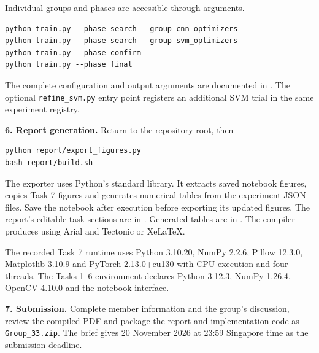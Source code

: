 Individual groups and phases are accessible through arguments.
\begin{verbatim}
python train.py --phase search --group cnn_optimizers
python train.py --phase search --group svm_optimizers
python train.py --phase confirm
python train.py --phase final
\end{verbatim}
The complete configuration and output arguments are documented in . The optional \texttt{refine\_svm.py} entry point registers an additional SVM trial in the same experiment registry.

\textbf{6. Report generation.} Return to the repository root, then
\begin{verbatim}
python report/export_figures.py
bash report/build.sh
\end{verbatim}
The exporter uses Python's standard library. It extracts saved notebook figures, copies Task 7 figures and generates numerical tables from the experiment JSON files. Save the notebook after execution before exporting its updated figures. The report's editable task sections are in . Generated tables are in . The compiler produces  using Arial and Tectonic or XeLaTeX.

The recorded Task 7 runtime uses Python 3.10.20, NumPy 2.2.6, Pillow 12.3.0, Matplotlib 3.10.9 and PyTorch 2.13.0+cu130 with CPU execution and four threads. The Tasks 1--6 environment declares Python 3.12.3, NumPy 1.26.4, OpenCV 4.10.0 and the notebook interface.

\textbf{7. Submission.} Complete member information and the group's discussion, review the compiled PDF and package the report and implementation code as \texttt{Group\_33.zip}. The brief gives 20 November 2026 at 23:59 Singapore time as the submission deadline.
